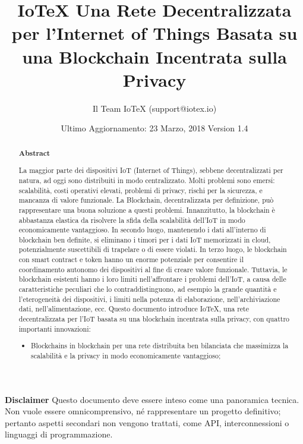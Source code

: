 \documentclass[a4paper,12pt]{article}
\title{IoTeX
\linebreak
\Large Una Rete Decentralizzata per l'Internet of Things
\linebreak
\Large Basata su una Blockchain Incentrata sulla Privacy}
\author{Il Team IoTeX (support@iotex.io)}
\date{Ultimo Aggiornamento: 23 Marzo, 2018
\linebreak Version 1.4}
\begin{document}
\maketitle

\vspace{120pt}


\textbf{Disclaimer} Questo documento deve essere inteso come una panoramica tecnica. Non vuole essere omnicomprensivo, né rappresentare un progetto definitivo; pertanto aspetti secondari non vengono trattati, come API, interconnessioni o linguaggi di programmazione.

\pagebreak

\begin{abstract}
    \begin{center}
        \textbf{Abstract}
    \end{center}
	La maggior parte dei dispositivi IoT (Internet of Things), sebbene decentralizzati per natura, ad oggi sono distribuiti in modo centralizzato. Molti problemi sono emersi: scalabilità, costi operativi elevati, problemi di privacy, rischi per la sicurezza, e mancanza di valore funzionale. La Blockchain, decentralizzata per definizione, può rappresentare una buona soluzione a questi problemi. Innanzitutto, la blockchain è abbastanza elastica da risolvere la sfida della scalabilità dell'IoT in modo economicamente vantaggioso. In secondo luogo, mantenendo i dati all'interno di blockchain ben definite, si eliminano i timori per i dati IoT memorizzati in cloud, potenzialmente suscettibili di trapelare o di essere violati. In terzo luogo, le blockchain con smart contract e token hanno un enorme potenziale per consentire il coordinamento autonomo dei dispositivi al fine di creare valore funzionale. Tuttavia, le blockchain esistenti hanno i loro limiti nell'affrontare i problemi dell'IoT, a causa delle caratteristiche peculiari che lo contraddistinguono, ad esempio la grande quantità e l'eterogeneità dei dispositivi, i limiti nella potenza di elaborazione, nell'archiviazione dati, nell'alimentazione, ecc.
	Questo documento introduce IoTeX, una rete decentralizzata per l'IoT basata su una blockchain incentrata sulla privacy, con quattro importanti innovazioni:

	\begin{itemize}

		\item{Blockchains in blockchain per una rete distribuita ben bilanciata che massimizza la scalabilità e la privacy in modo economicamente vantaggioso;}


\end{itemize}
\end{abstract}
\end{document}
